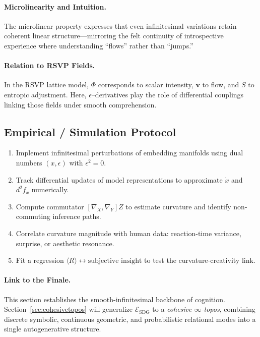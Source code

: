 \documentclass[12pt,a4paper,twoside,openright]{book}
\begin{document}
\paragraph{Microlinearity and Intuition.}
The microlinear property expresses that even infinitesimal variations
retain coherent linear structure—mirroring the felt continuity
of introspective experience where understanding ``flows'' rather than ``jumps.''

\paragraph{Relation to RSVP Fields.}
In the RSVP lattice model,
$\Phi$ corresponds to scalar intensity, $\mathbf{v}$ to flow,
and $\dot{S}$ to entropic adjustment.
Here, $\epsilon$–derivatives play the role of differential couplings
linking those fields under smooth comprehension.

\subsection*{Empirical / Simulation Protocol}

\begin{enumerate}
\item Implement infinitesimal perturbations of embedding manifolds
using dual numbers $(x,\epsilon)$ with $\epsilon^2=0$.
\item Track differential updates of model representations
to approximate $\dot{x}$ and $d^2f_x$ numerically.
\item Compute commutator $[\nabla_X,\nabla_Y]Z$
to estimate curvature and identify non-commuting inference paths.
\item Correlate curvature magnitude with human data:
reaction-time variance, surprise, or aesthetic resonance.
\item Fit a regression $\langle R\rangle\leftrightarrow
\text{subjective insight}$ to test the curvature-creativity link.
\end{enumerate}

\paragraph{Link to the Finale.}
This section establishes the smooth-infinitesimal backbone of cognition.
Section~\ref{sec:cohesivetopos} will generalize
$\mathcal{E}_{\mathrm{SDG}}$ to a \emph{cohesive $\infty$-topos},
combining discrete symbolic, continuous geometric,
and probabilistic relational modes
into a single autogenerative structure.
\end{document}
